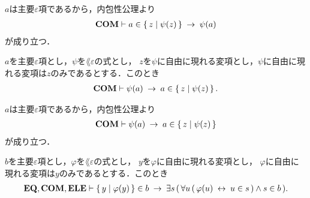 	\begin{sketch}
		$a$は主要$\varepsilon$項であるから，内包性公理より
		\begin{align}
			\mbox{\bf COM} \vdash a \in \left\{\, z \mid \psi(z)\, \right\} \hspace{0.25em}\rightarrow\hspace{0.25em} \psi(a)
		\end{align}
		が成り立つ．
		\QED
	\end{sketch}
	
	\begin{screen}
		\begin{thm}
		\label{thm:equivalent_formula_rewriting_8}
			$a$を主要$\varepsilon$項とし，$\psi$を$\lang{\varepsilon}$の式とし，
			$z$を$\psi$に自由に現れる変項とし，$\psi$に自由に現れる変項は$z$のみであるとする．このとき
			\begin{align}
				\mbox{\bf COM} \vdash \psi(a) \hspace{0.25em}\rightarrow\hspace{0.25em} a \in \left\{\, z \mid \psi(z)\, \right\}.
			\end{align}
		\end{thm}
	\end{screen}
	
	\begin{sketch}
		$a$は主要$\varepsilon$項であるから，内包性公理より
		\begin{align}
			\mbox{\bf COM} \vdash \psi(a) \hspace{0.25em}\rightarrow\hspace{0.25em} a \in \left\{\, z \mid \psi(z)\, \right\}
		\end{align}
		が成り立つ．
		\QED
	\end{sketch}
	
	\begin{screen}
		\begin{thm}
		\label{thm:equivalent_formula_rewriting_9}
			$b$を主要$\varepsilon$項とし，$\varphi$を$\lang{\varepsilon}$の式とし，
			$y$を$\varphi$に自由に現れる変項とし，
			$\varphi$に自由に現れる変項は$y$のみであるとする．このとき
			\begin{align}
				\mbox{{\bf EQ}},\mbox{\bf COM},\mbox{{\bf ELE}} \vdash \left\{\, y \mid \varphi(y)\, \right\} \in b
				\hspace{0.25em}\rightarrow\hspace{0.25em} \exists s\, (\, 
				\forall u\, (\, \varphi(u) \hspace{0.25em}\leftrightarrow\hspace{0.25em} u \in s\, )
				\wedge s \in b\, ).
			\end{align}
		\end{thm}
	\end{screen}
	
